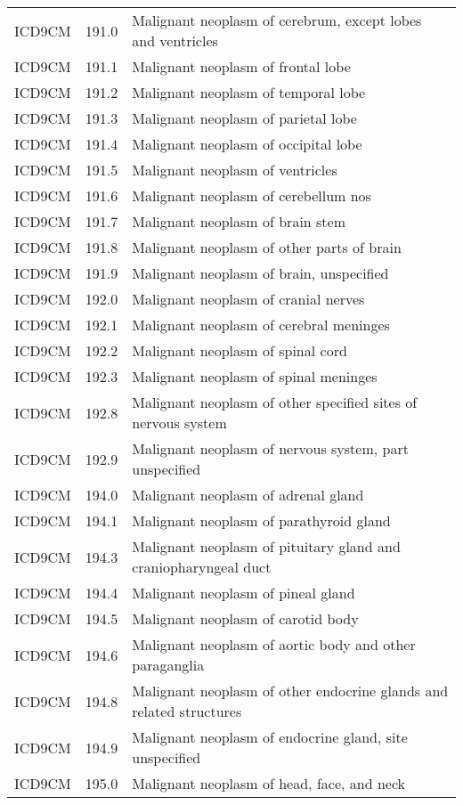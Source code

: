 \begin{longtable}{p{}p{}p{}}
  ICD9CM & 191.0 & Malignant neoplasm of cerebrum, except lobes and ventricles \\ 
  ICD9CM & 191.1 & Malignant neoplasm of frontal lobe \\ 
  ICD9CM & 191.2 & Malignant neoplasm of temporal lobe \\ 
  ICD9CM & 191.3 & Malignant neoplasm of parietal lobe \\ 
  ICD9CM & 191.4 & Malignant neoplasm of occipital lobe \\ 
  ICD9CM & 191.5 & Malignant neoplasm of ventricles \\ 
  ICD9CM & 191.6 & Malignant neoplasm of cerebellum nos \\ 
  ICD9CM & 191.7 & Malignant neoplasm of brain stem \\ 
  ICD9CM & 191.8 & Malignant neoplasm of other parts of brain \\ 
  ICD9CM & 191.9 & Malignant neoplasm of brain, unspecified \\ 
  ICD9CM & 192.0 & Malignant neoplasm of cranial nerves \\ 
  ICD9CM & 192.1 & Malignant neoplasm of cerebral meninges \\ 
  ICD9CM & 192.2 & Malignant neoplasm of spinal cord \\ 
  ICD9CM & 192.3 & Malignant neoplasm of spinal meninges \\ 
  ICD9CM & 192.8 & Malignant neoplasm of other specified sites of nervous system \\ 
  ICD9CM & 192.9 & Malignant neoplasm of nervous system, part unspecified \\ 
  ICD9CM & 194.0 & Malignant neoplasm of adrenal gland \\ 
  ICD9CM & 194.1 & Malignant neoplasm of parathyroid gland \\ 
  ICD9CM & 194.3 & Malignant neoplasm of pituitary gland and craniopharyngeal duct \\ 
  ICD9CM & 194.4 & Malignant neoplasm of pineal gland \\ 
  ICD9CM & 194.5 & Malignant neoplasm of carotid body \\ 
  ICD9CM & 194.6 & Malignant neoplasm of aortic body and other paraganglia \\ 
  ICD9CM & 194.8 & Malignant neoplasm of other endocrine glands and related structures \\ 
  ICD9CM & 194.9 & Malignant neoplasm of endocrine gland, site unspecified \\ 
  ICD9CM & 195.0 & Malignant neoplasm of head, face, and neck \\ 

\end{longtable}
